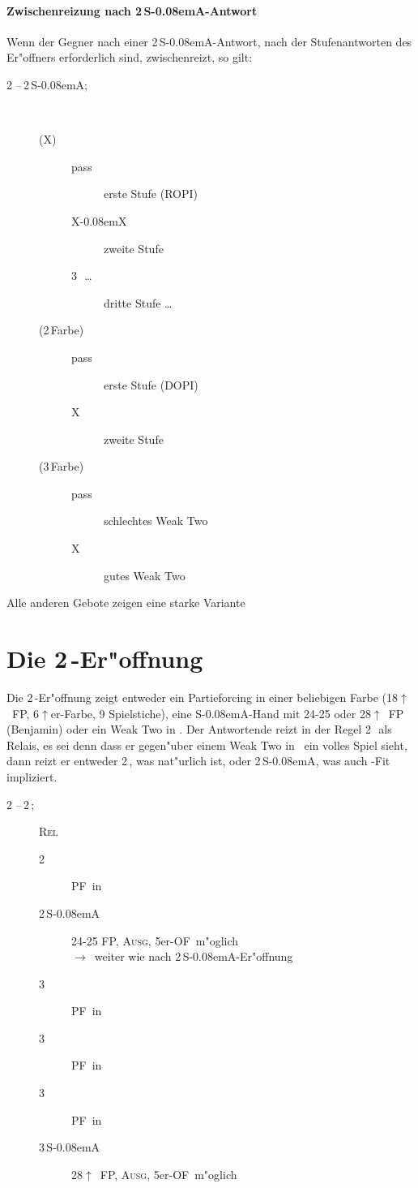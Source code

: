 \documentclass[11pt,german,twocolumn]{scrartcl}
\renewcommand{\Cl}{{\color{ClColor}{\clubs}}}
\renewcommand{\Di}{{\color{DiColor}{\sdiamonds}}}
\renewcommand{\He}{{\color{HeColor}{\shearts}}}
\renewcommand{\Sp}{{\color{SpColor}{\spades}}}
\def\pik{\,\Sp}
\def\coe{\,\He}
\def\kar{\,\Di}
\def\tre{\,\Cl}
\def\co{\He}
\def\ka{\Di}
\def\ra{$\rightarrow$}
\def\pl{$\uparrow$}
\def\ofa{\textsf{OF}}
\def\sa{\textsf{S\kern-0.08emA}}
\def\SA{\,\sa}
\def\kontra{\textsf{X}}
\def\rekontra{\textsf{X\kern-0.08emX}}
\def\sep{\,--\,}
\def\bal{\textsc{Ausg}}
\def\pf{\textsc{PF}}
\def\rel{\textsc{Rel}}
\def\bdsc{\begin{description}}
\def\edsc{\end{description}}
\begin{document}
\paragraph{Zwischenreizung nach 2\SA-Antwort}

Wenn der Gegner nach einer 2\SA-Antwort, nach der Stufenantworten des Er"offners
erforderlich sind, zwischenreizt, so gilt:

\bdsc
\item[2\tre\sep2\SA;] ~
  \bdsc
  \item[(\kontra)]
    \bdsc
    \item[pass] erste Stufe (ROPI)
    \item[\rekontra] zweite Stufe
    \item[3\tre\ \dots] dritte Stufe \dots
    \edsc
  \item[(2\,Farbe)]
    \bdsc
    \item[pass] erste Stufe (DOPI)
    \item[\kontra] zweite Stufe
    \edsc
  \item[(3\,Farbe)]
    \bdsc
    \item[pass] schlechtes Weak Two
    \item[\kontra] gutes Weak Two
    \edsc
  \edsc
\edsc

Alle anderen Gebote zeigen eine starke Variante

\section{Die 2\kar-Er"offnung}

Die 2\kar-Er"offnung zeigt entweder ein Partieforcing in einer beliebigen Farbe
(18\pl\ FP, 6\pl er-Farbe, 9 Spielstiche), eine \sa-Hand mit 24-25 oder
28\pl~FP (Benjamin) oder ein Weak Two in \co. Der Antwortende reizt in der
Regel 2\coe\ als Relais, es sei denn dass er gegen"uber einem Weak Two in \ka\
ein volles Spiel sieht, dann reizt er entweder 2\pik, was nat"urlich ist, oder
2\SA, was auch \co-Fit impliziert.

\bdsc
\item[2\kar\sep2\coe;] \rel
  \bdsc
  \item[2\pik] \pf\ in \pik
  \item[2\SA] 24-25 FP, \bal, 5er-\ofa\ m"oglich \\
    \ra\ weiter wie nach 2\SA-Er"offnung
  \item[3\tre] \pf\ in \tre
  \item[3\kar] \pf\ in \kar
  \item[3\coe] \pf\ in \coe
  \item[3\SA] 28\pl\ FP, \bal, 5er-\ofa\ m"oglich
  \edsc
\edsc
\end{document}
